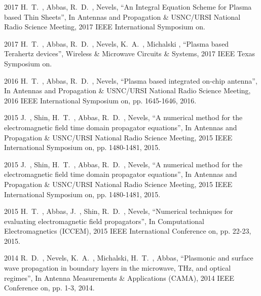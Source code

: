 \documentclass[10pt]{article}
\renewcommand{\section}[1]{\pagebreak[3]%
    \vspace{1.3\baselineskip}%
    \phantomsection\addcontentsline{toc}{section}{#1}%
    \noindent\llap{\scshape\smash{\parbox[t]{\marginparwidth}{\hyphenpenalty=10000\raggedright #1}}}%
    \vspace{-\baselineskip}\par}
\begin{document}
\begin{bibenum}
\item[2017] H.~T.~, Abbas, R.~D.~, Nevels, ``An Integral Equation Scheme for Plasma based Thin Sheets'', In Antennas and Propagation \& USNC/URSI National Radio Science Meeting, 2017 IEEE International Symposium on.

\item[2017] H.~T.~, Abbas, R.~D.~, Nevels, K.~A.~, Michalski , ``Plasma based Terahertz devices'', Wireless \& Microwave Circuits \& Systems, 2017 IEEE Texas Symposium on.
\item[2016] H.~T.~, Abbas, R.~D.~, Nevels, ``Plasma based integrated on-chip antenna'', In Antennas and Propagation \& USNC/URSI National Radio Science Meeting, 2016 IEEE International Symposium on, pp. 1645-1646, 2016.
\item[2015] J.~, Shin, H.~T.~, Abbas, R.~D.~, Nevels, ``A numerical method for the electromagnetic field time domain propagator equations'', In Antennas and Propagation \& USNC/URSI National Radio Science Meeting, 2015 IEEE International Symposium on, pp. 1480-1481, 2015.
\item[2015] J.~, Shin, H.~T.~, Abbas, R.~D.~, Nevels, ``A numerical method for the electromagnetic field time domain propagator equations'', In Antennas and Propagation \& USNC/URSI National Radio Science Meeting, 2015 IEEE International Symposium on, pp. 1480-1481, 2015.
\item[2015] H.~T.~, Abbas, J.~, Shin, R.~D.~, Nevels, ``Numerical techniques for evaluating electromagnetic field propagators'', In Computational Electromagnetics (ICCEM), 2015 IEEE International Conference on, pp. 22-23, 2015.
\item[2014] R.~D.~, Nevels, K.~A.~, Michalski, H.~T.~, Abbas, ``Plasmonic and surface wave propagation in boundary layers in the microwave, THz, and optical regimes'', In Antenna Measurements \& Applications (CAMA), 2014 IEEE Conference on, pp. 1-3, 2014.

\end{bibenum}

\section{Talks}
\end{document}

